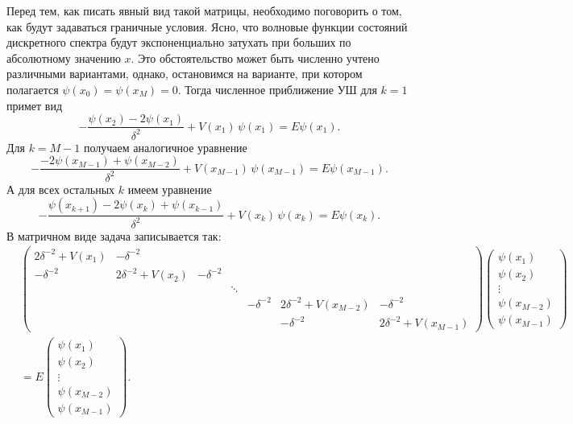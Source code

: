 \documentclass[11pt]{article}
\begin{document}
Перед тем, как писать явный вид такой матрицы, необходимо поговорить о том, как будут задаваться граничные условия. Ясно, что волновые функции состояний дискретного спектра будут экспоненциально затухать при больших по абсолютному значению $x$. Это обстоятельство может быть численно учтено различными вариантами, однако, остановимся на варианте, при котором полагается $\psi(x_0) = \psi(x_M) = 0$. Тогда численное приближение УШ для $k=1$ примет вид
\begin{equation}
    -\dfrac{\psi(x_{2}) - 2\psi(x_{1})}{\delta^2} + V(x_1)\,\psi(x_1) = E\psi(x_1).
\end{equation}
Для $k=M-1$ получаем аналогичное уравнение
\begin{equation}
    -\dfrac{-2\psi(x_{M-1})+\psi(x_{M-2}) }{\delta^2} + V(x_{M-1})\,\psi(x_{M-1}) = E\psi(x_{M-1}).
\end{equation}
А для всех остальных $k$ имеем уравнение
\begin{equation}
    -\dfrac{\psi(x_{k+1}) - 2\psi(x_{k}) + \psi(x_{k-1})}{\delta^2} + V(x_k)\,\psi(x_k) = E\psi(x_k).
\end{equation}
В матричном виде задача записывается так:
\begin{equation}
\begin{split}
    &\begin{pmatrix}
        2\delta^{-2}+V(x_1)& -\delta^{-2}\\
        -\delta^{-2}& 2\delta^{-2}+V(x_2)& -\delta^{-2}\\
        & & & \ddots&\\
        & & & & -\delta^{-2}& 2\delta^{-2}+V(x_{M-2})& -\delta^{-2}\\
        & & & & & -\delta^{-2}& 2\delta^{-2}+V(x_{M-1})
    \end{pmatrix}
    \begin{pmatrix}
        \psi(x_1)\\
        \psi(x_2)\\
        \vdots\\
        \psi(x_{M-2})\\
        \psi(x_{M-1})
    \end{pmatrix}\\
    &=E
    \begin{pmatrix}
        \psi(x_1)\\
        \psi(x_2)\\
        \vdots\\
        \psi(x_{M-2})\\
        \psi(x_{M-1})
    \end{pmatrix}.
\end{split}
\end{equation}
\end{document}
